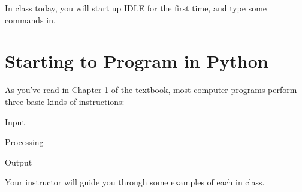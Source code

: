 In class today, you will start up IDLE for the first time, and type some commands in.

\section{Starting to Program in Python}

As you've read in Chapter 1 of the textbook, most computer programs perform three basic kinds of instructions:

\bi
    \item Input
    \item Processing
    \item Output
\ei

Your instructor will guide you through some examples of each in class.